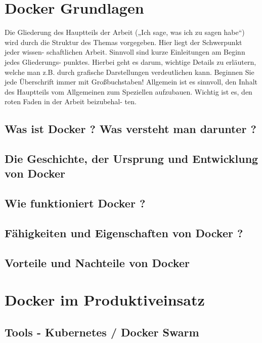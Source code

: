\documentclass[12pt,toc=bib,toc=listof]{scrreprt}
\begin{document}

\chapter{Docker Grundlagen} %
\label{sec:grundlagen}
Die Gliederung des Hauptteils der Arbeit („Ich sage, was ich zu sagen habe“) wird
durch die Struktur des Themas vorgegeben. Hier liegt der Schwerpunkt jeder wissen-
schaftlichen Arbeit. Sinnvoll sind kurze Einleitungen am Beginn jedes Gliederungs-
punktes. Hierbei geht es darum, wichtige Details zu erläutern, welche man z.B. durch
grafische Darstellungen verdeutlichen kann. Beginnen Sie jede Überschrift immer mit
Großbuchstaben! Allgemein ist es sinnvoll, den Inhalt des Hauptteils vom Allgemeinen
zum Speziellen aufzubauen. Wichtig ist es, den roten Faden in der Arbeit beizubehal-
ten.

\section{Was ist Docker ? Was versteht man darunter ?}

\section{Die Geschichte, der Ursprung und Entwicklung von Docker}

\section{Wie funktioniert Docker ?}

\section{Fähigkeiten und Eigenschaften von Docker ?}

\section{Vorteile und Nachteile von Docker}


\chapter{Docker im Produktiveinsatz}

\section{Tools - Kubernetes / Docker Swarm}
\end{document}
